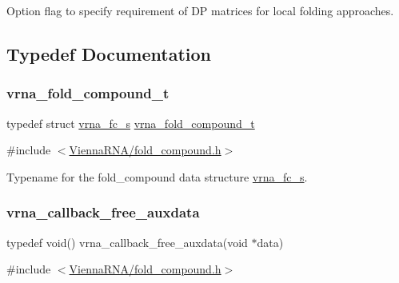 Option flag to specify requirement of DP matrices for local folding approaches. 



\subsection{Typedef Documentation}
\mbox{\label{group__fold__compound_ga1b0cef17fd40466cef5968eaeeff6166}} 
\subsubsection{\texorpdfstring{vrna\+\_\+fold\+\_\+compound\+\_\+t}{vrna\_fold\_compound\_t}}
{\footnotesize\ttfamily typedef struct \mbox{\hyperlink{group__fold__compound_structvrna__fc__s}{vrna\+\_\+fc\+\_\+s}} \mbox{\hyperlink{group__fold__compound_ga1b0cef17fd40466cef5968eaeeff6166}{vrna\+\_\+fold\+\_\+compound\+\_\+t}}}



{\ttfamily \#include $<$\mbox{\hyperlink{fold__compound_8h}{Vienna\+R\+N\+A/fold\+\_\+compound.\+h}}$>$}



Typename for the fold\+\_\+compound data structure \mbox{\hyperlink{group__fold__compound_structvrna__fc__s}{vrna\+\_\+fc\+\_\+s}}. 

\mbox{\label{group__fold__compound_ga7806651f51b195013839a218b3bbd5a3}} 
\subsubsection{\texorpdfstring{vrna\+\_\+callback\+\_\+free\+\_\+auxdata}{vrna\_callback\_free\_auxdata}}
{\footnotesize\ttfamily typedef void() vrna\+\_\+callback\+\_\+free\+\_\+auxdata(void $\ast$data)}



{\ttfamily \#include $<$\mbox{\hyperlink{fold__compound_8h}{Vienna\+R\+N\+A/fold\+\_\+compound.\+h}}$>$}




